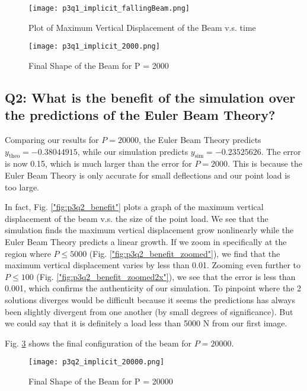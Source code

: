 \documentclass[letterpaper, 10 pt, conference]{ieeeconf}  %
\begin{document}
\begin{figure}[!ht]
        \centering
        \texttt{[image: p3q1\_implicit\_fallingBeam.png]}
        \caption{Plot of Maximum Vertical Displacement of the Beam v.s. time}
        \label{"fig:p3q1_max_vert"}
\end{figure}

\begin{figure}[!ht]
        \centering
        \texttt{[image: p3q1\_implicit\_2000.png]}
        \caption{Final Shape of the Beam for P = 2000}
        \label{"fig:p3q1_beam2000"}
\end{figure}

\subsection*{Q2: What is the benefit of the simulation over the predictions of the Euler Beam Theory?}

Comparing our results for $P = 20000$, the Euler Beam Theory predicts $y_{\text{theo}} = -0.38044915$, while our simulation predicts $y_{\text{sim}} = -0.23525626$. The error is now 0.15, which is much larger than the error for $P = 2000$. This is because the Euler Beam Theory is only accurate for small deflections and our point load is too large.

In fact, Fig. \ref{"fig:p3q2_benefit"} plots a graph of the maximum vertical displacement of the beam v.s. the size of the point load. We see that the simulation finds the maximum vertical displacement grow nonlinearly while the Euler Beam Theory predicts a linear growth. If we zoom in specifically at the region where $P \leq 5000$ (Fig. \ref{"fig:p3q2_benefit_zoomed"}), we find that the maximum vertical displacement varies by less than 0.01. Zooming even further to $P \leq 100$ (Fig. \ref{"fig:p3q2_benefit_zoomed2x"}), we see that the error is less than 0.001, which confirms the authenticity of our simulation. To pinpoint where the 2 solutions diverges would be difficult because it seems the predictions has always been slightly divergent from one another (by small degrees of significance). But we could say that it is definitely a load less than 5000 N from our first image. 

Fig. \ref{"fig:p3q1_beam20000"} shows the final configuration of the beam for $P = 20000$.

\begin{figure}[!ht]
        \centering
        \texttt{[image: p3q2\_implicit\_20000.png]}
        \caption{Final Shape of the Beam for P = 20000}
        \label{"fig:p3q1_beam20000"}
\end{figure}
\end{document}
